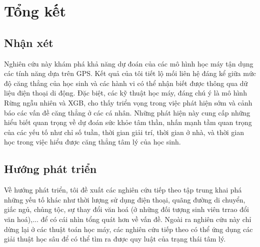 \chapter{Tổng kết}
\section{Nhận xét}
Nghiên cứu này khám phá khả năng dự đoán của các mô hình học máy tận dụng các tính năng dựa trên GPS. Kết quả của tôi tiết lộ mối liên hệ đáng kể giữa mức độ căng thẳng của học sinh và các hành vi có thể nhận biết được thông qua dữ liệu điện thoại di động. Đặc biệt, các kỹ thuật học máy, đáng chú ý là mô hình Rừng ngẫu nhiên và XGB, cho thấy triển vọng trong việc phát hiện sớm và cảnh báo các vấn đề căng thẳng ở các cá nhân. Những phát hiện này cung cấp những hiểu biết quan trọng về dự đoán sức khỏe tâm thần, nhấn mạnh tầm quan trọng của các yếu tố như chỉ số tuần, thời gian giải trí, thời gian ở nhà, và thời gian học trong việc hiểu được căng thẳng tâm lý của học sinh.
\section{Hướng phát triển}
Về hướng phát triển, tôi đề xuất các nghiên cứu tiếp theo tập trung khai phá những yếu tố khác như thời lượng sử dụng điện thoại, quãng đường di chuyển, giấc ngủ, chủng tộc, sự thay đổi văn hoá (ở những đối tượng sinh viên trrao đổi văn hoá),... để có cái nhìn tổng quát hơn về vấn đề. Ngoài ra nghiên cứu này chỉ dừng lại ở các thuật toán học máy, các nghiên cứu tiếp theo có thể ứng dụng các giải thuật học sâu để có thể tìm ra được quy luật của trạng thái tâm lý.